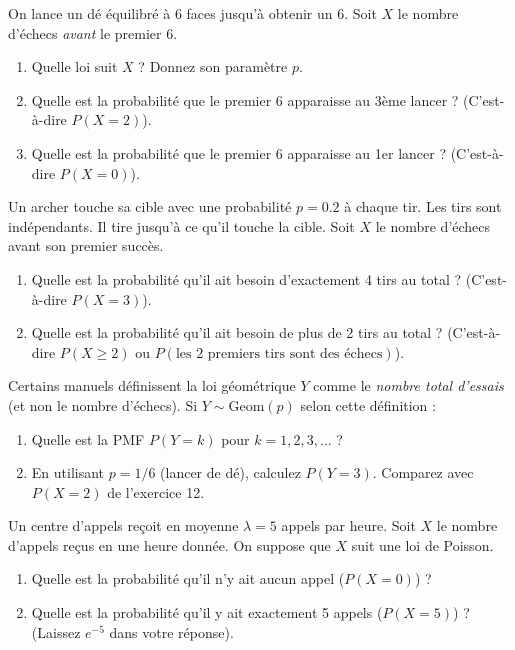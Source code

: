 
\begin{exercicebox}
On lance un dé équilibré à 6 faces jusqu'à obtenir un 6. Soit $X$ le nombre d'échecs \textit{avant} le premier 6.
\begin{enumerate}
    \item Quelle loi suit $X$ ? Donnez son paramètre $p$.
    \item Quelle est la probabilité que le premier 6 apparaisse au 3ème lancer ? (C'est-à-dire $P(X=2)$).
    \item Quelle est la probabilité que le premier 6 apparaisse au 1er lancer ? (C'est-à-dire $P(X=0)$).
\end{enumerate}
\end{exercicebox}

\begin{exercicebox}
Un archer touche sa cible avec une probabilité $p=0.2$ à chaque tir. Les tirs sont indépendants. Il tire jusqu'à ce qu'il touche la cible. Soit $X$ le nombre d'échecs avant son premier succès.
\begin{enumerate}
    \item Quelle est la probabilité qu'il ait besoin d'exactement 4 tirs au total ? (C'est-à-dire $P(X=3)$).
    \item Quelle est la probabilité qu'il ait besoin de plus de 2 tirs au total ? (C'est-à-dire $P(X \ge 2)$ ou $P(\text{les 2 premiers tirs sont des échecs})$).
\end{enumerate}
\end{exercicebox}

\begin{exercicebox}
Certains manuels définissent la loi géométrique $Y$ comme le \textit{nombre total d'essais} (et non le nombre d'échecs). Si $Y \sim \text{Geom}(p)$ selon cette définition :
\begin{enumerate}
    \item Quelle est la PMF $P(Y=k)$ pour $k=1, 2, 3, \dots$ ?
    \item En utilisant $p=1/6$ (lancer de dé), calculez $P(Y=3)$. Comparez avec $P(X=2)$ de l'exercice 12.
\end{enumerate}
\end{exercicebox}


\begin{exercicebox}
Un centre d'appels reçoit en moyenne $\lambda = 5$ appels par heure. Soit $X$ le nombre d'appels reçus en une heure donnée. On suppose que $X$ suit une loi de Poisson.
\begin{enumerate}
    \item Quelle est la probabilité qu'il n'y ait aucun appel ($P(X=0)$) ?
    \item Quelle est la probabilité qu'il y ait exactement 5 appels ($P(X=5)$) ? (Laissez $e^{-5}$ dans votre réponse).
\end{enumerate}
\end{exercicebox}

